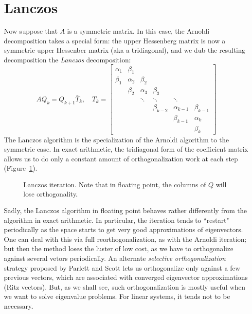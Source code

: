 \section{Lanczos}

Now suppose that $A$ is a symmetric matrix.  In this case, the Arnoldi
decomposition takes a special form: the upper Hessenberg matrix is now
a symmetric upper Hessenber matrix (aka a tridiagonal), and we dub
the resulting decomposition the {\em Lanczos} decomposition:
\[
  AQ_k = Q_{k+1} \bar{T}_k, \quad
  T_k =
  \begin{bmatrix}
    \alpha_1 & \beta_1 \\
    \beta_1 & \alpha_2 & \beta_2 \\
            & \beta_2 & \alpha_3 & \beta_3 \\
            & & \ddots & \ddots & \ddots \\
            & & & \beta_{k-2} & \alpha_{k-1} & \beta_{k-1} \\
            & & & & \beta_{k-1} & \alpha_k \\
            & & & & & \beta_k
  \end{bmatrix}
\]
The Lanczos algorithm is the specialization of the Arnoldi algorithm
to the symmetric case.  In exact arithmetic, the tridiagonal form of
the coefficient matrix allows us to do only a constant amount of
orthogonalization work at each step (Figure~\ref{lanczos}).

\begin{figure}

\caption{Lanczos iteration.  Note that in floating point, the columns
  of $Q$ will lose orthogonality.}
\label{lanczos}
\end{figure}

Sadly, the Lanczos algorithm in floating point behaves rather differently
from the algorithm in exact arithmetic.  In particular, the iteration
tends to ``restart'' periodically as the space starts to get very good
approximations of eigenvectors.  One can deal with this via full
reorthogonalization, as with the Arnoldi iteration; but then the method
loses the luster of low cost, as we have to orthogonalize against several
vetors periodically.  An alternate {\em selective orthogonalization}
strategy proposed by Parlett and Scott lets us orthogonalize only against
a few previous vectors, which are associated with converged eigenvector
approximations (Ritz vectors).  But, as we shall see, such orthogonalization
is mostly useful when we want to solve eigenvalue problems.  For linear
systems, it tends not to be necessary.
